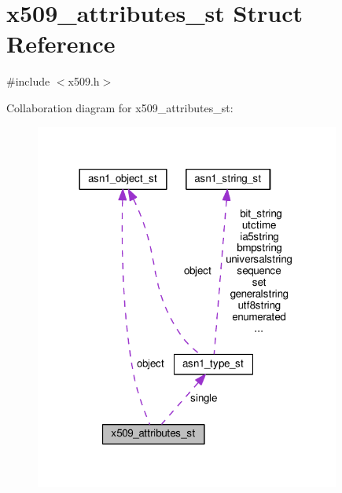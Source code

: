 \hypertarget{structx509__attributes__st}{}\section{x509\+\_\+attributes\+\_\+st Struct Reference}
\label{structx509__attributes__st}


{\ttfamily \#include $<$x509.\+h$>$}



Collaboration diagram for x509\+\_\+attributes\+\_\+st\+:
\nopagebreak
\begin{figure}[H]
\begin{center}
\leavevmode
\includegraphics[width=284pt]{structx509__attributes__st__coll__graph}
\end{center}
\end{figure}
